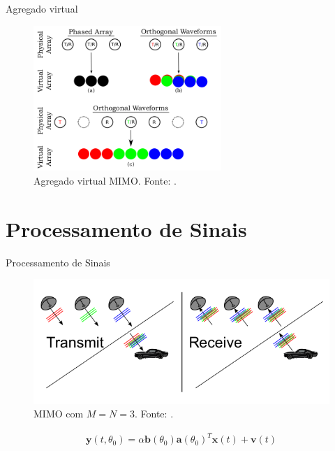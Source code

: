 \documentclass[portuguese]{beamer}
\begin{document}
\begin{frame}{Agregado virtual}
  \begin{figure}[]
	\centering
	\includegraphics[height=5.5cm]{../report/graphics/virt1.png}
	\caption{Agregado virtual MIMO. Fonte: \cite{davis2015mimo}.}
	\label{fig:virt1}
  \end{figure}
\end{frame}

\section{Processamento de Sinais}

\begin{frame}{Processamento de Sinais}
  \begin{figure}[]
	\centering
	\includegraphics[width=0.9\linewidth]{../report/graphics/rad3.png}
	\caption{MIMO com $M=N=3$. Fonte: \cite{davis2015mimo}.}
	\label{fig:r3}
  \end{figure}
  \begin{align*}
    \mathbf{y}(t,\theta_0) = \alpha\mathbf{b}(\theta_0)\mathbf{a}(\theta_0)^T\mathbf{x}(t)+\mathbf{v}(t)
  \end{align*}
\end{frame}
\end{document}
